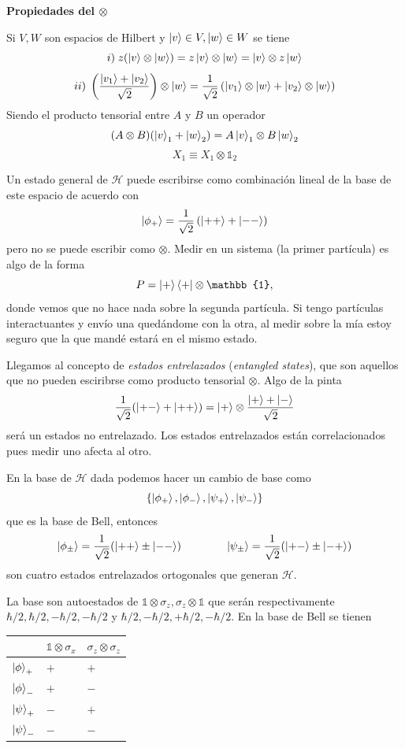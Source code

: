 \documentclass[10pt,oneside]{CBFT_book}
\begin{document}
\begin{ejemplo}{\bf Propiedades del $\otimes$}

Si $V,W$ son espacios de Hilbert y $\Ket{v} \in V, \Ket{w}  \in W$ se tiene
\[
	i) \; z(\Ket{v}\otimes\Ket{w}) = z\Ket{v}\otimes\Ket{w} = \Ket{v}\otimes z \Ket{w}
\]
\[
	ii) \; \left( \frac{  \Ket{v_1} + \Ket{v_2}  }{ \sqrt{2} } \right) \otimes \Ket{w} =
	\frac{1}{\sqrt{2}} \left( \Ket{v_1} \otimes \Ket{w} + 
	\Ket{v_2} \otimes \Ket{w} \right)
\]
Siendo el producto tensorial entre $A$ y $B$ un operador
\[
	(A \otimes B)( \Ket{v}_1 + \Ket{w}_2 )  = A \Ket{v}_1 \otimes B \Ket{w}_2
\]
\[
	X_1 \equiv X_1 \otimes \mathbb{1}_2
\]

\end{ejemplo}

Un estado general de $\mathcal{H}$ puede escribirse como combinación lineal de la base de este
espacio de acuerdo con
\[
	\Ket{\phi_+} = \frac{1}{\sqrt{2}} \left( \Ket{++} + \Ket{--} \right)
\]
pero no se puede escribir como $\otimes$.
Medir en un sistema (la primer partícula) es algo de la forma
\[
	P = \KB{+}{+} \otimes \mathbb{1},
\]
donde vemos que no hace nada sobre la segunda partícula.
Si tengo partículas interactuantes y envío una quedándome con la otra, al medir sobre la mía
estoy seguro que la que mandé estará en el mismo estado.

Llegamos al concepto de {\it estados entrelazados} ({\it entangled states}), que son aquellos que
no pueden esciribrse como producto tensorial $\otimes$. Algo de la pinta
\[
	\frac{1}{\sqrt{2}}( \Ket{+-} + \Ket{++} ) = 
	\Ket{+} \otimes \frac{\Ket{+} + \Ket{-}}{\sqrt{2}}
\]
será un estados no entrelazado. Los estados entrelazados están correlacionados pues medir uno
afecta al otro.

En la base de $\mathcal{H}$ dada podemos hacer un cambio de base como
\[
	\{ \Ket{\phi_+}, \Ket{\phi_-}, \Ket{\psi_+}, \Ket{\psi_-} \}
\]
que es la base de Bell, entonces
\[
	\Ket{\phi_\pm} = \frac{1}{\sqrt{2}}( \Ket{++} \pm \Ket{--} ) 
	\qquad \qquad 
	\Ket{\psi_\pm} = \frac{1}{\sqrt{2}}( \Ket{+-} \pm \Ket{-+} )
\]
son cuatro estados entrelazados ortogonales que generan $\mathcal{H}$.

La base son autoestados de $\mathbb{1} \otimes \sigma_z, \sigma_z \otimes \mathbb{1}$ que serán
respectivamente $\hbar/2,\hbar/2,-\hbar/2,-\hbar/2$ y $\hbar/2,-\hbar/2,+\hbar/2,-\hbar/2$.
En la base de Bell se tienen

\begin{tabular}{|l|l|l|}
 & $\mathbb{1} \otimes \sigma_x$ & $\sigma_z \otimes \sigma_z $ \\
 \hline 
 $\Ket{\phi}_+$ & $+$ & $+$ \\
 $\Ket{\phi}_-$ & $+$ & $-$ \\
 $\Ket{\psi}_+$ & $-$ & $+$ \\
 $\Ket{\psi}_-$ & $-$ & $-$
\end{tabular}
\end{document}
